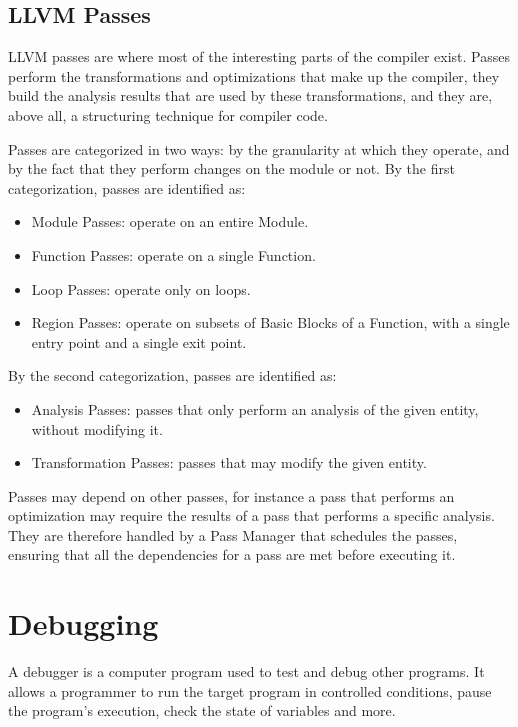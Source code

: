 \subsection{LLVM Passes}
LLVM passes are where most of the interesting parts of the compiler exist. Passes perform the transformations and optimizations that make up the compiler, they build the analysis results that are used by these transformations, and they are, above all, a structuring technique for compiler code. \par
Passes are categorized in two ways: by the granularity at which they operate, and by the fact that they perform changes on the module or not. \newline
By the first categorization, passes are identified as:
\begin{itemize}
\item Module Passes: operate on an entire Module.
\item Function Passes: operate on a single Function.
\item Loop Passes: operate only on loops.
\item Region Passes: operate on subsets of Basic Blocks of a Function, with a single entry point and a single exit point.
\end{itemize}
By the second categorization, passes are identified as:
\begin{itemize}
\item Analysis Passes: passes that only perform an analysis of the given entity, without modifying it. 
\item Transformation Passes: passes that may modify the given entity.
\end{itemize} \par 
Passes may depend on other passes, for instance a pass that performs an optimization may require the results of a pass that performs a specific analysis.
They are therefore handled by a Pass Manager that schedules the passes, ensuring that all the dependencies for a pass are met before executing it. 

\section{Debugging}
A debugger is a computer program used to test and debug other programs. It allows a programmer to run the target program in controlled conditions, pause the program's execution, check the state of variables and more.

